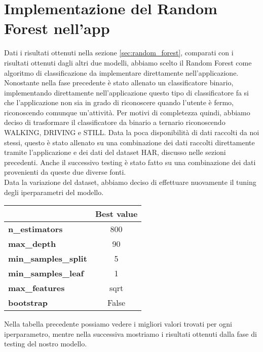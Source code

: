 \documentclass[../../Report.tex]{subfiles}
\begin{document}
\section{Implementazione del Random Forest nell'app}
Dati i risultati ottenuti nella sezione \ref{sec:random_forest}, comparati con i risultati ottenuti dagli altri due modelli, abbiamo scelto il Random Forest come algoritmo di classificazione da implementare direttamente nell'applicazione. Nonostante nella fase precedente è stato allenato un classificatore binario, implementando direttamente nell'applicazione questo tipo di classificatore fa si che l'applicazione non sia in grado di riconoscere quando l'utente è fermo, riconoscendo comunque un'attività. Per motivi di completezza quindi, abbiamo deciso di trasformare il classificatore da binario a ternario riconoscendo WALKING, DRIVING e STILL. Data la poca disponibilità di dati raccolti da noi stessi, questo è stato allenato su una combinazione dei dati raccolti direttamente tramite l'applicazione e dei dati del dataset HAR, discusso nelle sezioni precedenti. Anche il successivo testing è stato fatto su una combinazione dei dati provenienti da queste due diverse fonti.\\
Data la variazione del dataset, abbiamo deciso di effettuare nuovamente il tuning degli iperparametri del modello.

\begin{table}[H]
    \centering
    \begin{tabular}{|l|c|}
        \hline
        & \textbf{Best value} \\
        \hline
        \textbf{n\_estimators} & 800 \\
        \hline
        \textbf{max\_depth} & 90 \\
        \hline
        \textbf{min\_samples\_split} & 5 \\
        \hline
        \textbf{min\_samples\_leaf} & 1 \\
        \hline
        \textbf{max\_features} & sqrt \\
        \hline
        \textbf{bootstrap} & False \\
        \hline
    \end{tabular}
\end{table}
Nella tabella precedente possiamo vedere i migliori valori trovati per ogni iperparametro, mentre nella successiva mostriamo i risultati ottenuti dalla fase di testing del nostro modello. 
\end{document}
